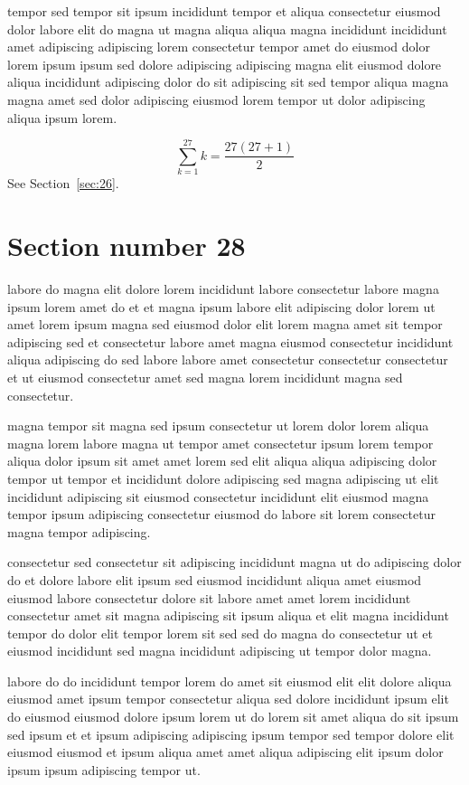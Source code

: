 \documentclass{article}
\begin{document}
tempor sed tempor sit ipsum incididunt tempor et aliqua consectetur eiusmod dolor labore elit do magna ut magna aliqua aliqua magna incididunt incididunt amet adipiscing adipiscing lorem consectetur tempor amet do eiusmod dolor lorem ipsum ipsum sed dolore adipiscing adipiscing magna elit eiusmod dolore aliqua incididunt adipiscing dolor do sit adipiscing sit sed tempor aliqua magna magna amet sed dolor adipiscing eiusmod lorem tempor ut dolor adipiscing aliqua ipsum lorem.

\begin{equation} \sum_{k=1}^{27} k = \frac{27(27+1)}{2} \end{equation}
See Section~\ref{sec:26}.

\section{Section number 28}\label{sec:28}
labore do magna elit dolore lorem incididunt labore consectetur labore magna ipsum lorem amet do et et magna ipsum labore elit adipiscing dolor lorem ut amet lorem ipsum magna sed eiusmod dolor elit lorem magna amet sit tempor adipiscing sed et consectetur labore amet magna eiusmod consectetur incididunt aliqua adipiscing do sed labore labore amet consectetur consectetur consectetur et ut eiusmod consectetur amet sed magna lorem incididunt magna sed consectetur.

magna tempor sit magna sed ipsum consectetur ut lorem dolor lorem aliqua magna lorem labore magna ut tempor amet consectetur ipsum lorem tempor aliqua dolor ipsum sit amet amet lorem sed elit aliqua aliqua adipiscing dolor tempor ut tempor et incididunt dolore adipiscing sed magna adipiscing ut elit incididunt adipiscing sit eiusmod consectetur incididunt elit eiusmod magna tempor ipsum adipiscing consectetur eiusmod do labore sit lorem consectetur magna tempor adipiscing.

consectetur sed consectetur sit adipiscing incididunt magna ut do adipiscing dolor do et dolore labore elit ipsum sed eiusmod incididunt aliqua amet eiusmod eiusmod labore consectetur dolore sit labore amet amet lorem incididunt consectetur amet sit magna adipiscing sit ipsum aliqua et elit magna incididunt tempor do dolor elit tempor lorem sit sed sed do magna do consectetur ut et eiusmod incididunt sed magna incididunt adipiscing ut tempor dolor magna.

labore do do incididunt tempor lorem do amet sit eiusmod elit elit dolore aliqua eiusmod amet ipsum tempor consectetur aliqua sed dolore incididunt ipsum elit do eiusmod eiusmod dolore ipsum lorem ut do lorem sit amet aliqua do sit ipsum sed ipsum et et ipsum adipiscing adipiscing ipsum tempor sed tempor dolore elit eiusmod eiusmod et ipsum aliqua amet amet aliqua adipiscing elit ipsum dolor ipsum ipsum adipiscing tempor ut.
\end{document}
